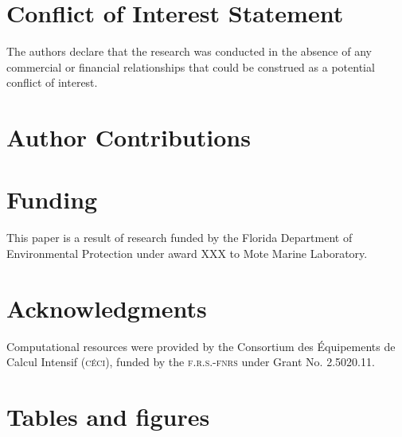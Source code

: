 \documentclass[utf8]{frontiersSCNS}
\begin{document}
\section*{Conflict of Interest Statement}
The authors declare that the research was conducted in the absence of any commercial or financial relationships that could be construed as a potential conflict of interest.

\section*{Author Contributions}
  
\section*{Funding}
This paper is a result of research funded by the Florida Department of Environmental Protection under award XXX to Mote Marine Laboratory. 

\section*{Acknowledgments}
Computational resources were provided by the Consortium des \'Equipements de Calcul Intensif (\textsc{c\'eci}), funded by the \textsc{f.r.s.-fnrs} under Grant No. 2.5020.11.


 



\section*{Tables and figures}
\end{document}
